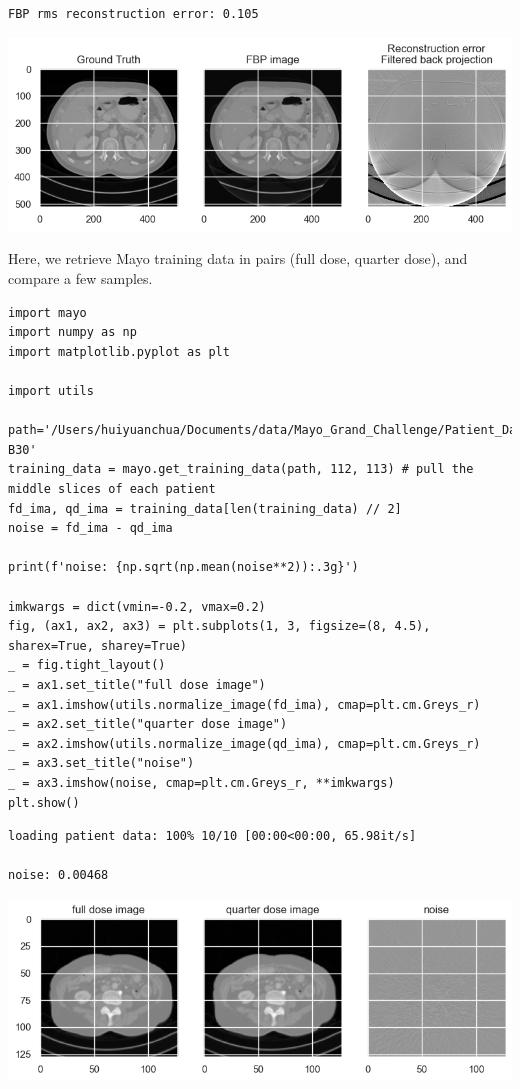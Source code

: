 \documentclass[a4paper, 11pt]{article}
\begin{document}
\begin{verbatim}
FBP rms reconstruction error: 0.105
\end{verbatim}

\begin{center}
\includegraphics[width=.9\linewidth]{./.ob-jupyter/aae84632d2a803a7aac0bf7c4eb669df0b4008ec.png}
\end{center}

Here, we retrieve Mayo training data in pairs (full dose, quarter dose), and compare a few samples.
\begin{verbatim}
import mayo
import numpy as np
import matplotlib.pyplot as plt

import utils

path='/Users/huiyuanchua/Documents/data/Mayo_Grand_Challenge/Patient_Data/Training_Image_Data/3mm B30'
training_data = mayo.get_training_data(path, 112, 113) # pull the middle slices of each patient
fd_ima, qd_ima = training_data[len(training_data) // 2]
noise = fd_ima - qd_ima

print(f'noise: {np.sqrt(np.mean(noise**2)):.3g}')

imkwargs = dict(vmin=-0.2, vmax=0.2)
fig, (ax1, ax2, ax3) = plt.subplots(1, 3, figsize=(8, 4.5), sharex=True, sharey=True)
_ = fig.tight_layout()
_ = ax1.set_title("full dose image")
_ = ax1.imshow(utils.normalize_image(fd_ima), cmap=plt.cm.Greys_r)
_ = ax2.set_title("quarter dose image")
_ = ax2.imshow(utils.normalize_image(qd_ima), cmap=plt.cm.Greys_r)
_ = ax3.set_title("noise")
_ = ax3.imshow(noise, cmap=plt.cm.Greys_r, **imkwargs)
plt.show()

\end{verbatim}

\begin{verbatim}
loading patient data: 100% 10/10 [00:00<00:00, 65.98it/s]

noise: 0.00468
\end{verbatim}

\begin{center}
\includegraphics[width=.9\linewidth]{./.ob-jupyter/87b4f042c9bbc291a64110740ae09645af97d617.png}
\end{center}
\end{document}
